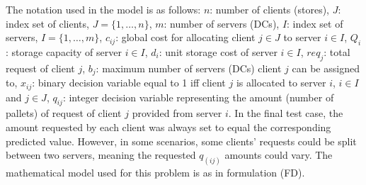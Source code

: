 \documentclass[11pt]{article}
\begin{document}
The notation used in the model is as follows:
	$n$: number of clients (stores),
	$J$: index set of clients, $J=\{1, \ldots, n\}$,
	$m$: number of servers (DCs),
	$I$: index set of servers, $I=\{1, \ldots, m\}$,
	$c_{ij}$: global cost for allocating client $j \in J$ to server $i \in I$,
	$Q_i$: storage capacity of server $i \in I$,
	$d_i$: unit storage cost of server $i \in I$,
	$req_j$: total request of client $j$,
	$b_j$: maximum number of servers (DCs) client $j$ can be assigned to,
	$x_{ij}$: binary decision variable equal to 1 iff client $j$ is allocated to server $i$, $i \in I$ and $j \in J$,
	$q_{ij}$: integer decision variable representing the amount (number of pallets) of request of client $j$ provided from server $i$.
In the final test case, the amount requested by each client was always set to equal the corresponding predicted value. However, in some scenarios, some clients' requests could be split between two servers, meaning the requested $q_(ij)$ amounts could vary.
The mathematical model used for this problem is as in formulation (FD).
\end{document}

